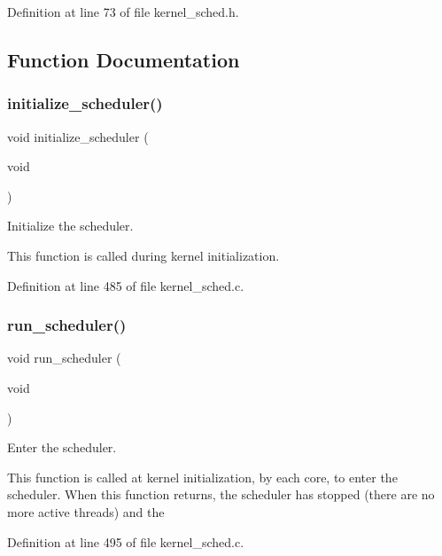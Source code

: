 Definition at line 73 of file kernel\+\_\+sched.\+h.



\subsection{Function Documentation}
\mbox{\label{group__scheduler_ga244fb594301322e79d11a7844c759bba}} 
\subsubsection{\texorpdfstring{initialize\+\_\+scheduler()}{initialize\_scheduler()}}
{\footnotesize\ttfamily void initialize\+\_\+scheduler (\begin{DoxyParamCaption}\item[{void}]{ }\end{DoxyParamCaption})}



Initialize the scheduler. 

This function is called during kernel initialization. 

Definition at line 485 of file kernel\+\_\+sched.\+c.

\mbox{\label{group__scheduler_ga147600b59d656eb9d9558673c2fad36d}} 
\subsubsection{\texorpdfstring{run\+\_\+scheduler()}{run\_scheduler()}}
{\footnotesize\ttfamily void run\+\_\+scheduler (\begin{DoxyParamCaption}\item[{void}]{ }\end{DoxyParamCaption})}



Enter the scheduler. 

This function is called at kernel initialization, by each core, to enter the scheduler. When this function returns, the scheduler has stopped (there are no more active threads) and the 

Definition at line 495 of file kernel\+\_\+sched.\+c.

